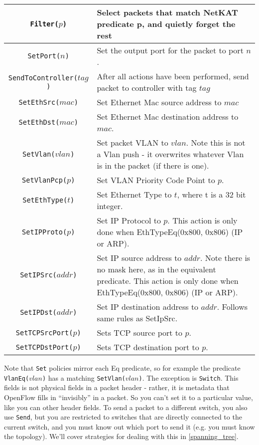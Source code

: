 \bigskip
\begin{tabularx}{6in}{|c|X|}
\hline\hline
\texttt{Filter($p$)} & Select packets that match NetKAT predicate p, and quietly forget the rest  
\\ \hline
\texttt{SetPort($n$)} & Set the output port for the packet to port $n$.    
\\ \hline
\texttt{SendToController($tag$)} & After all actions have been performed, send packet to controller with tag $tag$    
\\ \hline
\texttt{SetEthSrc($mac$)} & Set Ethernet Mac source address to $mac$
\\ \hline
\texttt{SetEthDst($mac$)} & Set Ethernet Mac destination address to $mac$.
\\ \hline
\texttt{SetVlan($vlan$)} & Set packet VLAN to $vlan$.  Note this is not a Vlan push - it overwrites whatever 
Vlan is in the packet (if there is one).  
\\ \hline
\texttt{SetVlanPcp($p$)} & Set VLAN Priority Code Point to $p$.
\\ \hline
\texttt{SetEthType($t$)} & Set Ethernet Type to $t$, where t is a 32 bit integer.
\\ \hline
\texttt{SetIPProto($p$)} & Set IP Protocol to $p$.    
This action is only done when EthTypeEq(0x800, 0x806) (IP or ARP). 
\\ \hline
\texttt{SetIPSrc($addr$)} & Set IP source address to $addr$.  Note there is no mask here, as in the equivalent predicate.  
This action is only done when EthTypeEq(0x800, 0x806) (IP or ARP). 
\\ \hline
\texttt{SetIPDst($addr$)} & Set IP destination address to $addr$.  
Follows same rules as SetIpSrc.
\\ \hline
\texttt{SetTCPSrcPort($p$)} & Sets TCP source port to $p$.
\\ \hline
\texttt{SetTCPDstPort($p$)} & Sets TCP destination port to $p$.  
\\ \hline\hline
\end{tabularx}
\bigskip

Note that \texttt{Set} policies mirror each Eq predicate, so for example the predicate \texttt{VlanEq($vlan$)} has a matching
\texttt{SetVlan($vlan$)}.
The exception is \texttt{Switch}.  
This fields is not physical fields in a packet header - rather, it is metadata that OpenFlow fills in ``invisibly''
in a packet.
So you can't set it to a particular value, like you can other header fields.
To send a packet to a different switch, you also use \texttt{Send}, but you are restricted to switches that are directly
connected to the current switch, and you must know out which port to send it (e.g. you must know the topology).
We'll cover strategies for dealing with this in \ref{spanning_tree}.
 
